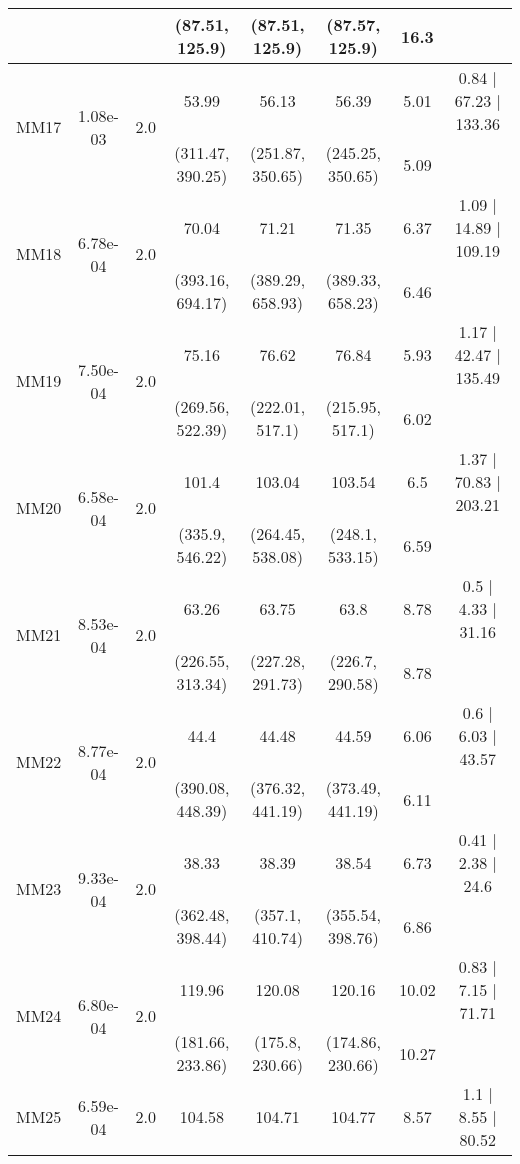 \begin{longtable}{|c|c|c|c|c|c|c|c|}
	 &  &  & (87.51, 125.9) & (87.51, 125.9) & (87.57, 125.9) & 16.3 & \\
 	\hline
	\multirow{2}{*}{MM17} & \multirow{2}{*}{1.08e-03} & \multirow{2}{*}{2.0} & 53.99 & 56.13 & 56.39 & 5.01 & 0.84 $\mid$ 67.23 $\mid$ 133.36\\
	 &  &  & (311.47, 390.25) & (251.87, 350.65) & (245.25, 350.65) & 5.09 & \\
 	\hline
	\multirow{2}{*}{MM18} & \multirow{2}{*}{6.78e-04} & \multirow{2}{*}{2.0} & 70.04 & 71.21 & 71.35 & 6.37 & 1.09 $\mid$ 14.89 $\mid$ 109.19\\
	 &  &  & (393.16, 694.17) & (389.29, 658.93) & (389.33, 658.23) & 6.46 & \\
 	\hline
	\multirow{2}{*}{MM19} & \multirow{2}{*}{7.50e-04} & \multirow{2}{*}{2.0} & 75.16 & 76.62 & 76.84 & 5.93 & 1.17 $\mid$ 42.47 $\mid$ 135.49\\
	 &  &  & (269.56, 522.39) & (222.01, 517.1) & (215.95, 517.1) & 6.02 & \\
 	\hline
	\multirow{2}{*}{MM20} & \multirow{2}{*}{6.58e-04} & \multirow{2}{*}{2.0} & 101.4 & 103.04 & 103.54 & 6.5 & 1.37 $\mid$ 70.83 $\mid$ 203.21\\
	 &  &  & (335.9, 546.22) & (264.45, 538.08) & (248.1, 533.15) & 6.59 & \\
 	\hline
	\multirow{2}{*}{MM21} & \multirow{2}{*}{8.53e-04} & \multirow{2}{*}{2.0} & 63.26 & 63.75 & 63.8 & 8.78 & 0.5 $\mid$ 4.33 $\mid$ 31.16\\
	 &  &  & (226.55, 313.34) & (227.28, 291.73) & (226.7, 290.58) & 8.78 & \\
 	\hline
	\multirow{2}{*}{MM22} & \multirow{2}{*}{8.77e-04} & \multirow{2}{*}{2.0} & 44.4 & 44.48 & 44.59 & 6.06 & 0.6 $\mid$ 6.03 $\mid$ 43.57\\
	 &  &  & (390.08, 448.39) & (376.32, 441.19) & (373.49, 441.19) & 6.11 & \\
 	\hline
	\multirow{2}{*}{MM23} & \multirow{2}{*}{9.33e-04} & \multirow{2}{*}{2.0} & 38.33 & 38.39 & 38.54 & 6.73 & 0.41 $\mid$ 2.38 $\mid$ 24.6\\
	 &  &  & (362.48, 398.44) & (357.1, 410.74) & (355.54, 398.76) & 6.86 & \\
 	\hline
	\multirow{2}{*}{MM24} & \multirow{2}{*}{6.80e-04} & \multirow{2}{*}{2.0} & 119.96 & 120.08 & 120.16 & 10.02 & 0.83 $\mid$ 7.15 $\mid$ 71.71\\
	 &  &  & (181.66, 233.86) & (175.8, 230.66) & (174.86, 230.66) & 10.27 & \\
 	\hline
	\multirow{2}{*}{MM25} & \multirow{2}{*}{6.59e-04} & \multirow{2}{*}{2.0} & 104.58 & 104.71 & 104.77 & 8.57 & 1.1 $\mid$ 8.55 $\mid$ 80.52\\

\end{longtable}
